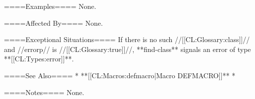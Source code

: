 ====Examples====
None.

====Affected By====
None.

====Exceptional Situations====
If there is no such //[[CL:Glossary:class]]// and //errorp// is //[[CL:Glossary:true]]//, **find-class** signals an error of type **[[CL:Types:error]]**.

====See Also====
  * **[[CL:Macros:defmacro|Macro DEFMACRO]]**
  * {\secref\IntegratingTypesAndClasses}

====Notes====
None.

  
